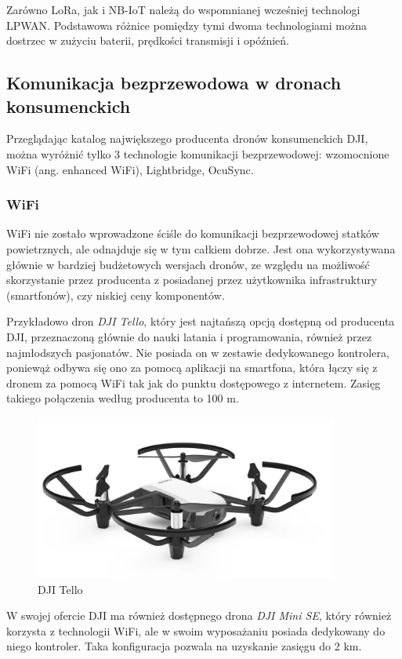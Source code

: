   
Zarówno LoRa, jak i NB-IoT należą do wspomnianej wcześniej technologi LPWAN. Podstawowa różnice pomiędzy tymi dwoma technologiami można dostrzec w zużyciu baterii, prędkości transmisji i opóźnień.

\subsection{Komunikacja bezprzewodowa w dronach konsumenckich}
Przeglądając katalog największego producenta dronów konsumenckich DJI, można wyróżnić tylko 3 technologie komunikacji bezprzewodowej: wzomocnione WiFi (ang. enhanced WiFi), Lightbridge, OcuSync.

\subsubsection{WiFi}
WiFi nie zostało wprowadzone ściśle do komunikacji bezprzewodowej statków powietrznych, ale odnajduje się w tym całkiem dobrze. Jest ona wykorzystywana głównie w bardziej budżetowych wersjach dronów, ze względu na możliwość skorzystanie przez producenta z posiadanej przez użytkownika infrastruktury (smartfonów), czy niskiej ceny komponentów.

Przykładowo dron \textit{DJI Tello}, który jest najtańszą opcją dostępną od producenta DJI, przeznaczoną głównie do nauki latania i programowania, również przez najmłodszych pasjonatów. Nie posiada on w zestawie dedykowanego kontrolera, poniewąż odbywa się ono za pomocą aplikacji na smartfona, która łączy się z dronem za pomocą WiFi tak jak do punktu dostępowego z internetem. Zasięg takiego połączenia według producenta to 100 m.\cite{dji-store}


\begin{figure}[!htbp]
  \centering
  \includegraphics[width=10cm]{./Obrazy/dji-tello.jpg}
  \caption{DJI Tello}
  \end{figure}

W swojej ofercie DJI ma również dostępnego drona \textit{DJI Mini SE}, który również korzysta z technologii WiFi, ale w swoim wyposażaniu posiada dedykowany do niego kontroler. Taka konfiguracja pozwala na uzyskanie zasięgu do 2 km. \cite{dji-mavic-mini-se-spec}


